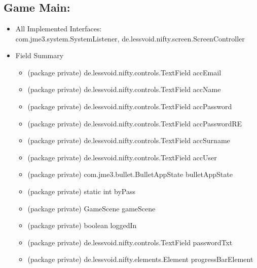 \documentclass[letterpaper]{article}
\begin{document}
		
		\vspace{0.2in}
		
		\section*{\colorbox{blue}{}} 
		\vspace{0.1in}
		
			\subsection*{Game Main:}
			\vspace{0.1in}
				
				\begin{itemize}
					\item 	All Implemented Interfaces: \\
							com.jme3.system.SystemListener, de.lessvoid.nifty.screen.ScreenController
					\item	Field Summary
							\begin{itemize}
								\item	(package private) de.lessvoid.nifty.controls.TextField	accEmail 
								\item	(package private) de.lessvoid.nifty.controls.TextField	accName 
								\item	(package private) de.lessvoid.nifty.controls.TextField	accPassword 
								\item	(package private) de.lessvoid.nifty.controls.TextField	accPasswordRE 
								\item	(package private) de.lessvoid.nifty.controls.TextField	accSurname 
								\item	(package private) de.lessvoid.nifty.controls.TextField	accUser 
								\item	(package private) com.jme3.bullet.BulletAppState	bulletAppState 
								\item	(package private) static int	byPass 
								\item	(package private) GameScene	gameScene 
								\item	(package private) boolean	loggedIn 
								\item	(package private) de.lessvoid.nifty.controls.TextField	passwordTxt 
								\item	(package private) de.lessvoid.nifty.elements.Element	progressBarElement 

\end{itemize}
\end{itemize}
\end{document}
